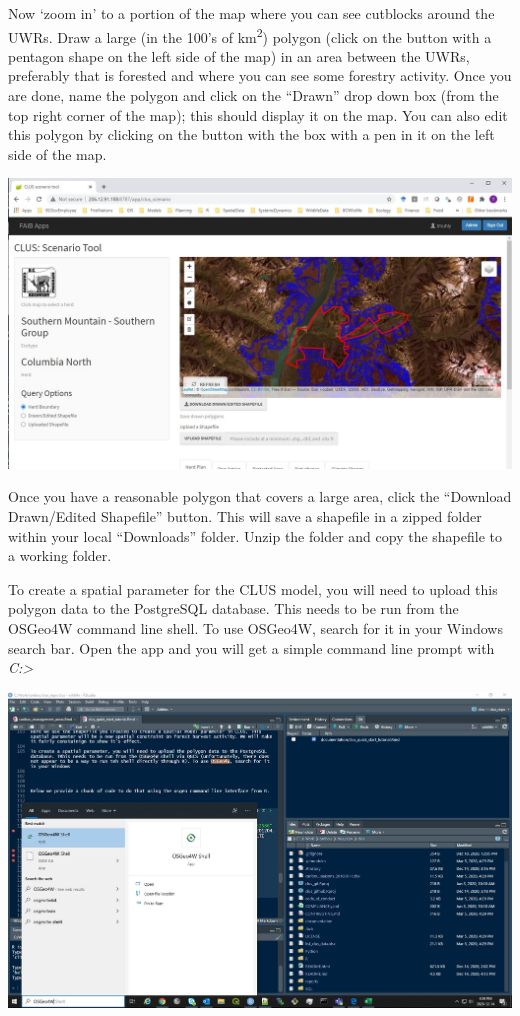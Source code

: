 \documentclass[
]{article}
\begin{document}
Now `zoom in' to a portion of the map where you can see cutblocks around
the UWRs. Draw a large (in the 100's of km\textsuperscript{2}) polygon
(click on the button with a pentagon shape on the left side of the map)
in an area between the UWRs, preferably that is forested and where you
can see some forestry activity. Once you are done, name the polygon and
click on the ``Drawn'' drop down box (from the top right corner of the
map); this should display it on the map. You can also edit this polygon
by clicking on the button with the box with a pen in it on the left side
of the map.

\includegraphics{images/scen_tool_cn2.jpg}

Once you have a reasonable polygon that covers a large area, click the
``Download Drawn/Edited Shapefile'' button. This will save a shapefile
in a zipped folder within your local ``Downloads'' folder. Unzip the
folder and copy the shapefile to a working folder.

To create a spatial parameter for the CLUS model, you will need to
upload this polygon data to the PostgreSQL database. This needs to be
run from the OSGeo4W command line shell. To use OSGeo4W, search for it
in your Windows search bar. Open the app and you will get a simple
command line prompt with \emph{C:\textgreater{}}

\includegraphics{images/osgeo.jpg}
\end{document}
